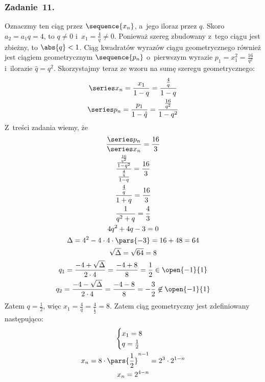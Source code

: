 \subsubsection*{Zadanie~11.}
Oznaczmy ten ciąg przez \(\sequence{x_n}\), a~jego iloraz przez \(q\). Skoro \(a_2 = a_1q = 4\), to \(q \neq 0\) i~\(x_1 = \frac{4}{q} \neq 0\). Ponieważ szereg zbudowany z~tego ciągu jest zbieżny, to \(\abs{q} < 1\). Ciąg kwadratów wyrazów ciągu geometrycznego również jest ciągiem geometrycznym \(\sequence{p_n}\) o~pierwszym wyrazie \(p_1 = x_1^2 = \frac{16}{q^2}\) i~ilorazie \(\hat{q} = q^2\). Skorzystajmy teraz ze wzoru na sumę szeregu geometrycznego:
\begin{gather*}
    \series x_n = \frac{x_1}{1 - q} = \frac{\frac{4}{q}}{1 - q}\\
    \series p_n = \frac{p_1}{1 - \hat{q}} = \frac{\frac{16}{q^2}}{1 - q^2}
\end{gather*}
Z~treści zadania wiemy, że
\begin{gather*}
    \frac{\series p_n}{\series x_n} = \frac{16}{3}\\
    \frac{\frac{\frac{16}{q^2}}{1 - q^2}}{\frac{\frac{4}{q}}{1 - q}} = \frac{16}{3}\\
    \frac{\frac{4}{q}}{1 + q} = \frac{16}{3}\\
    \frac{1}{q^2 + q} = \frac{4}{3}\\
    4q^2 + 4q - 3 = 0\\
    \Delta = 4^2 - 4 \cdot 4 \cdot \pars{-3} = 16 + 48 = 64\\
    \sqrt{\Delta} = \sqrt{64} = 8\\
    q_1 = \frac{-4 + \sqrt{\Delta}}{2 \cdot 4} = \frac{-4 + 8}{8} = \frac{1}{2} \in \open{-1}{1}\\
    q_2 = \frac{-4 - \sqrt{\Delta}}{2 \cdot 4} = \frac{-4 - 8}{8} = -\frac{3}{2} \not\in \open{-1}{1}
\end{gather*}
Zatem \(q = \frac{1}{2}\), więc \(x_1 = \frac{4}{q} = \frac{4}{\frac{1}{2}} = 8\). Zatem ciąg geometryczny jest zdefiniowany następująco:
\begin{gather*}
    \begin{cases}
        x_1 = 8\\
        q = \frac{1}{2}
    \end{cases}\\
    x_n = 8 \cdot \pars{\frac{1}{2}}^{n - 1} = 2^3 \cdot 2^{1 - n}\\
    x_n = 2^{4 - n}
\end{gather*}
